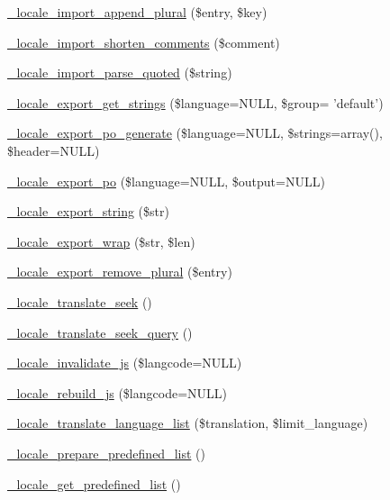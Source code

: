 \begin{CompactItemize}
\hyperlink{group__locale_gd0abff75e696db162d5b90acda071371}{\_\-locale\_\-import\_\-append\_\-plural} (\$entry, \$key)
\item 
\hyperlink{group__locale_g1cba05a4c159b1ed844f18ba484cc8e7}{\_\-locale\_\-import\_\-shorten\_\-comments} (\$comment)
\item 
\hyperlink{group__locale_gac1954e79c57539b5599ff4ed7379df7}{\_\-locale\_\-import\_\-parse\_\-quoted} (\$string)
\item 
\hyperlink{group__locale_gde17be27a5240ba4804dc51eccf40246}{\_\-locale\_\-export\_\-get\_\-strings} (\$language=NULL, \$group= 'default')
\item 
\hyperlink{group__locale_g694b7e78936d2875e18ef4c8171b7eb8}{\_\-locale\_\-export\_\-po\_\-generate} (\$language=NULL, \$strings=array(), \$header=NULL)
\item 
\hyperlink{group__locale_gc152719d6aeadee6074247100424e145}{\_\-locale\_\-export\_\-po} (\$language=NULL, \$output=NULL)
\item 
\hyperlink{group__locale_g8203c2c5a4f964da2395889920934fae}{\_\-locale\_\-export\_\-string} (\$str)
\item 
\hyperlink{group__locale_gae41274b64222185a36a42dbc0ff4b94}{\_\-locale\_\-export\_\-wrap} (\$str, \$len)
\item 
\hyperlink{group__locale_ga18a14faeb8268aee1530afb6b03cca1}{\_\-locale\_\-export\_\-remove\_\-plural} (\$entry)
\item 
\hyperlink{group__locale_g006049082d29be75fd8ad396beda5883}{\_\-locale\_\-translate\_\-seek} ()
\item 
\hyperlink{group__locale_g3afc18d03a7b2355e9328bc211acc4d1}{\_\-locale\_\-translate\_\-seek\_\-query} ()
\item 
\hyperlink{group__locale_ge1eec455fe9fcd01af98bb37ff4096ae}{\_\-locale\_\-invalidate\_\-js} (\$langcode=NULL)
\item 
\hyperlink{group__locale_g1235873f9a64b606895cd77628bffabc}{\_\-locale\_\-rebuild\_\-js} (\$langcode=NULL)
\item 
\hyperlink{group__locale_gcf9e97475d1e1ffaaf336e3a943163a2}{\_\-locale\_\-translate\_\-language\_\-list} (\$translation, \$limit\_\-language)
\item 
\hyperlink{group__locale_gdf3279a1c940efe6955edc1899a97aad}{\_\-locale\_\-prepare\_\-predefined\_\-list} ()
\item 
\hyperlink{group__locale_gfac9d59fd436286a3f3738140ce96e82}{\_\-locale\_\-get\_\-predefined\_\-list} ()
\item 

\end{CompactItemize}
